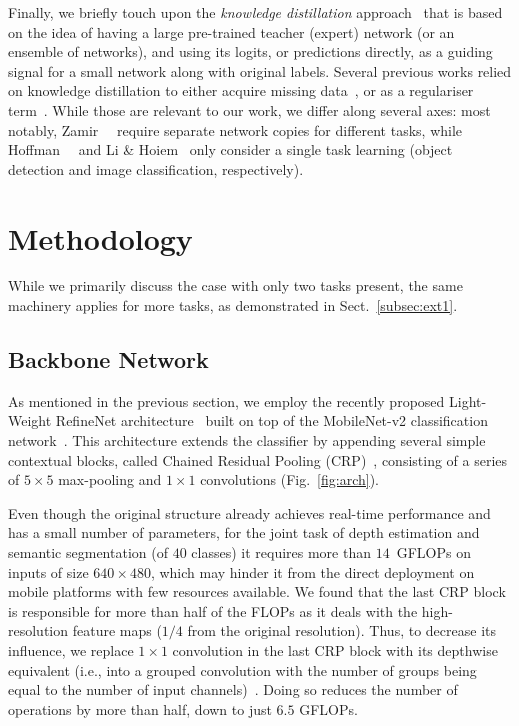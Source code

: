 \documentclass[letterpaper, 10 pt, conference]{ieeeconf}
\begin{document}
Finally, we briefly touch upon the {\em knowledge distillation} approach~\cite{BucilaCN06,HintonVD15,BaC14,RomeroBKCGB14} that is based on the idea of having a large pre-trained teacher (expert) network (or an ensemble of networks), and using its logits, or predictions directly, as a guiding signal for a small network along with original labels. Several previous works relied on knowledge distillation to either acquire missing data~\cite{zamir2018taskonomy}, or as a regulariser term~\cite{hoffman2016learning,li2017learning}. While those are relevant to our work, we differ along several axes: most notably, Zamir~\etal~\cite{zamir2018taskonomy} require separate network copies for different tasks, while Hoffman~\etal~\cite{hoffman2016learning} and Li \& Hoiem~\cite{li2017learning} only consider a single task learning (object detection and image classification, respectively).


\section{Methodology}
While we primarily discuss the case with only two tasks present, the same machinery applies for more tasks, as demonstrated in Sect.~\ref{subsec:ext1}.
\label{sec:method}

\subsection{Backbone Network}
As mentioned in the previous section, we employ the recently proposed Light-Weight RefineNet architecture~\cite{nekrasovlight} built on top of the MobileNet-v2 classification network~\cite{abs-1801-04381}. This architecture extends the classifier by appending several simple contextual blocks, called Chained Residual Pooling (CRP)~\cite{LinMSR17}, consisting of a series of $5\times5$ max-pooling and $1\times1$ convolutions (Fig.~\ref{fig:arch}).

Even though the original structure already achieves real-time performance and has a small number of parameters, for the joint task of depth estimation and semantic segmentation (of $40$ classes) it requires more than $14$~GFLOPs on inputs of size $640\times480$, which may hinder it from the direct deployment on mobile platforms with few resources available. We found that the last CRP block is responsible for more than half of the FLOPs as it deals with the high-resolution feature maps ($1/4$ from the original resolution). Thus, to decrease its influence, we replace $1\times1$ convolution in the last CRP block with its depthwise equivalent (i.e., into a grouped convolution with the number of groups being equal to the number of input channels)~\cite{Chollet17}. Doing so reduces the number of operations by more than half, down to just $6.5$ GFLOPs.
\end{document}
